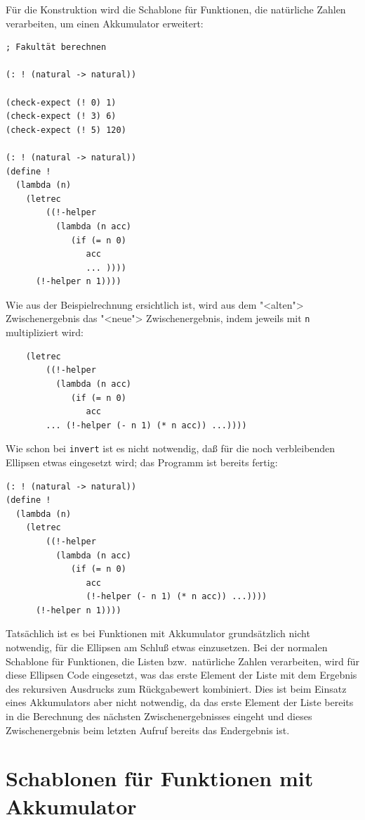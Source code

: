 Für die Konstruktion wird die Schablone für Funktionen, die natürliche
Zahlen verarbeiten, um einen Akkumulator erweitert:
\label{page:factorial-tail}
%
\begin{verbatim}
; Fakultät berechnen

(: ! (natural -> natural))

(check-expect (! 0) 1)
(check-expect (! 3) 6)
(check-expect (! 5) 120)

(: ! (natural -> natural))
(define !
  (lambda (n)
    (letrec
        ((!-helper
          (lambda (n acc)
             (if (= n 0)
                acc
                ... ))))
      (!-helper n 1))))
\end{verbatim}
%
Wie aus der Beispielrechnung ersichtlich ist, wird aus dem "<alten">
Zwischenergebnis das "<neue"> Zwischenergebnis, indem jeweils
mit \texttt{n} multipliziert wird:
%
\begin{verbatim}
    (letrec
        ((!-helper
          (lambda (n acc)
             (if (= n 0)
                acc
        ... (!-helper (- n 1) (* n acc)) ...))))
\end{verbatim}
%
Wie schon bei \texttt{invert} ist es nicht notwendig, daß für die
noch verbleibenden Ellipsen etwas eingesetzt wird; das Programm ist
bereits fertig:
%
\begin{verbatim}
(: ! (natural -> natural))
(define !
  (lambda (n)
    (letrec
        ((!-helper
          (lambda (n acc)
             (if (= n 0)
                acc
                (!-helper (- n 1) (* n acc)) ...))))
      (!-helper n 1))))
\end{verbatim}
%
Tatsächlich ist es bei Funktionen mit Akkumulator grundsätzlich nicht
notwendig, für die Ellipsen am Schluß etwas einzusetzen. Bei der
normalen Schablone für Funktionen, die Listen bzw.\ natürliche Zahlen
verarbeiten, wird für diese Ellipsen Code eingesetzt, was das erste
Element der Liste mit dem Ergebnis des rekursiven Ausdrucks 
zum Rückgabewert kombiniert.  Dies ist beim Einsatz eines Akkumulators
aber nicht notwendig, da das erste Element der Liste bereits in die
Berechnung des nächsten Zwischenergebnisses eingeht und dieses
Zwischenergebnis beim letzten Aufruf bereits das Endergebnis ist.

\section{Schablonen für Funktionen mit Akkumulator}

